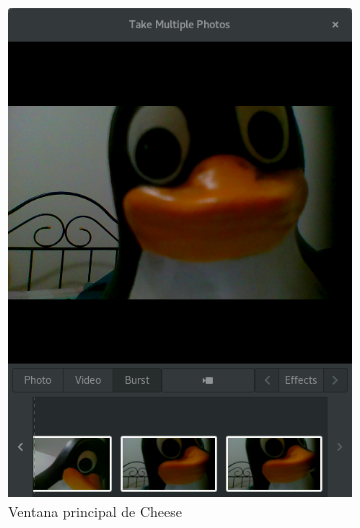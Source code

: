 \documentclass[a4paper,openright,12pt]{report}
\begin{document}
\begin{figure}
\begin{subfigure}{0.4\textwidth}
  \includegraphics[width=\textwidth]{../images/cheese-viewport.png}
  \caption{Ventana principal de Cheese}
\end{subfigure}
\hfill\vrule\hfill
\begin{subfigure}{0.4\textwidth}

\end{subfigure}
\end{figure}
\end{document}
